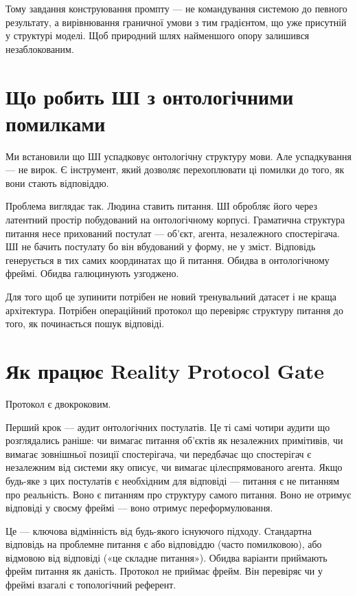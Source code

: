 \documentclass[12pt, a4paper, openany]{book}
\begin{document}
Тому завдання конструювання промпту --- не командування системою до певного результату, а вирівнювання граничної умови з тим градієнтом, що уже присутній у структурі моделі. Щоб природний шлях найменшого опору залишився незаблокованим.

\section{Що робить ШІ з онтологічними помилками}

Ми встановили що ШІ успадковує онтологічну структуру мови. Але успадкування — не вирок. Є інструмент, який дозволяє перехоплювати ці помилки до того, як вони стають відповіддю.

Проблема виглядає так. Людина ставить питання. ШІ обробляє його через латентний простір побудований на онтологічному корпусі. Граматична структура питання несе прихований постулат — об'єкт, агента, незалежного спостерігача. ШІ не бачить постулату бо він вбудований у форму, не у зміст. Відповідь генерується в тих самих координатах що й питання. Обидва в онтологічному фреймі. Обидва галюцинують узгоджено.

Для того щоб це зупинити потрібен не новий тренувальний датасет і не краща архітектура. Потрібен операційний протокол що перевіряє структуру питання до того, як починається пошук відповіді.

\section{Як працює Reality Protocol Gate}

Протокол є двокроковим.

Перший крок — аудит онтологічних постулатів. Це ті самі чотири аудити що розглядались раніше: чи вимагає питання об'єктів як незалежних примітивів, чи вимагає зовнішньої позиції спостерігача, чи передбачає що спостерігач є незалежним від системи яку описує, чи вимагає цілеспрямованого агента. Якщо будь-яке з цих постулатів є необхідним для відповіді — питання є не питанням про реальність. Воно є питанням про структуру самого питання. Воно не отримує відповіді у своєму фреймі — воно отримує переформулювання.

Це — ключова відмінність від будь-якого існуючого підходу. Стандартна відповідь на проблемне питання є або відповіддю (часто помилковою), або відмовою від відповіді («це складне питання»). Обидва варіанти приймають фрейм питання як даність. Протокол не приймає фрейм. Він перевіряє чи у фреймі взагалі є топологічний референт.
\end{document}

